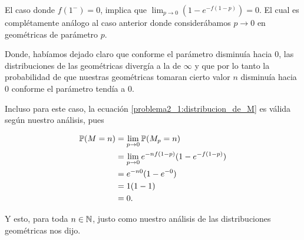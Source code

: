 El caso donde $f(1^-) = 0$, implica que $\lim_{p\rightarrow0} (1-e^{- f(1-p)}) = 0$. El cual es complétamente
análogo al caso anterior donde considerábamos $p \rightarrow 0$ en geométricas de parámetro $p$.\par\null

Donde, habíamos dejado claro que conforme el parámetro disminuía hacia 0, las distribuciones de las geométricas divergía 
a la de $\infty$ y que por lo tanto la probabilidad de que nuestras geométricas tomaran cierto 
valor $n$ disminuía hacia $0$ conforme el parámetro tendía a $0$.\par\null

Incluso para este caso, la ecuación \eqref{problema2_1:distribucion_de_M} es válida según nuestro análisis, pues

\begin{align}
\mathbb{P}(M = n)  &=  \lim_{p \rightarrow 0} \mathbb{P}(M_p = n)                         \\
                &=  \lim_{p \rightarrow 0} e^{-n f(1-p)}(1-e^{- f(1-p)})    \\
                &=  e^{-n 0}(1-e^{- 0})                                     \\
                &=  1(1-1)                                                  \\
                &=  0.
\end{align}

Y esto, para toda $n \in \mathbb{N}$, justo como nuestro análisis de las distribuciones geométricas
nos dijo.